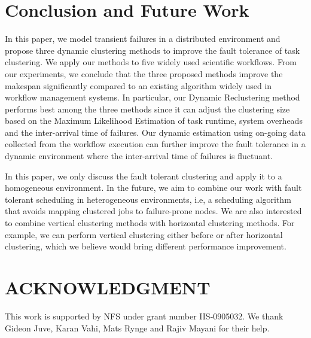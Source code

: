 \documentclass{IOS-Book-Article}
\begin{document}
\section{Conclusion and Future Work}

In this paper, we model transient failures in a distributed environment and propose three dynamic clustering methods to improve the fault tolerance of task clustering. We apply our methods to five widely used scientific workflows. From our experiments, we conclude that the three proposed methods improve the makespan significantly compared to an existing algorithm widely used in workflow management systems. In particular, our Dynamic Reclustering method performs best among the three methods since it can adjust the clustering size based on the Maximum Likelihood Estimation of task runtime, system overheads and the inter-arrival time of failures.  Our dynamic estimation using on-going data collected from the workflow execution can further improve the fault tolerance in a dynamic environment where the inter-arrival time of failures is fluctuant. 

In this paper, we only discuss the fault tolerant clustering and apply it to a homogeneous environment. In the future, we aim to combine our work with fault tolerant scheduling in heterogeneous environments, i.e, a scheduling algorithm that avoids mapping clustered jobs to failure-prone nodes. We are also interested to combine vertical clustering methods with horizontal clustering methods. For example, we can perform vertical clustering either before or after horizontal clustering, which we believe would bring different performance improvement. 

\section{ACKNOWLEDGMENT}
This work is supported by NFS under grant number IIS-0905032. We thank Gideon Juve, Karan Vahi, Mats Rynge and Rajiv Mayani for their help. 




\end{document}
